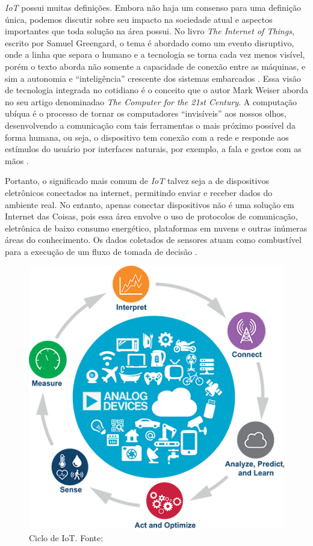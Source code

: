 \textit{IoT} possui muitas definições. Embora não haja um consenso para uma definição única, podemos discutir sobre seu impacto na sociedade atual e aspectos importantes que toda solução na área possui. No livro \textit{The Internet  of Things}, escrito por 
Samuel Greengard, o tema é abordado como um evento disruptivo, onde a linha que separa o humano e a tecnologia se torna cada vez menos visível, porém o texto aborda não somente a capacidade de conexão entre as máquinas, e sim a autonomia 
e ``inteligência'' crescente dos sistemas embarcados \cite[pp. 17]{book-iot}. Essa visão de tecnologia integrada no cotidiano é o conceito que o autor Mark Weiser aborda no seu artigo denominadao \textit{The Computer for the 21st Century}. A computação ubíqua 
é o processo de tornar os computadores ``invisíveis'' aos nossos olhos, desenvolvendo a comunicação com tais ferramentas o mais próximo possível da forma humana, ou seja, o dispositivo tem conexão com a rede e responde aos estímulos do usuário por 
interfaces naturais, por exemplo, a fala e gestos com as mãos \cite{ubiquitous-computing}.

Portanto, o significado mais comum de \textit{IoT} talvez seja a de dispositivos eletrônicos conectados na internet, permitindo 
enviar e receber dados do ambiente real. No entanto, apenas conectar dispositivos não é uma solução em Internet das Coisas, pois essa 
área envolve o uso de protocolos de comunicação, eletrônica de baixo consumo energético, plataformas em nuvens e outras inúmeras 
áreas do conhecimento. Os dados coletados de sensores atuam como combustível para a execução de um fluxo de tomada de decisão \cite{iot-cycle}. 

\begin{figure}[ht]
    \centering
    \includegraphics[width=.45\textwidth]{img/iot-cycle.png}
    \caption{Ciclo de IoT. Fonte:\cite{iot-cycle}}\label{figIoTCycle}
\end{figure}

